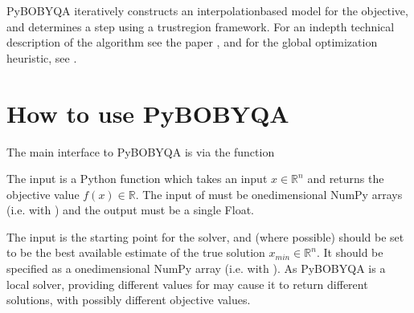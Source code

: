 \documentclass[letterpaper,10pt,english]{sphinxmanual}
\begin{document}
Py\sphinxhyphen{}BOBYQA iteratively constructs an interpolation\sphinxhyphen{}based model for the objective, and determines a step using a trust\sphinxhyphen{}region framework.
For an in\sphinxhyphen{}depth technical description of the algorithm see the paper , and for the global optimization heuristic, see .


\section{How to use Py\sphinxhyphen{}BOBYQA}
\label{\detokenize{userguide:how-to-use-py-bobyqa}}
The main interface to Py\sphinxhyphen{}BOBYQA is via the function 
\begin{quote}

\begin{sphinxVerbatim}[commandchars=\\\{\}]
   
\end{sphinxVerbatim}
\end{quote}

The input  is a Python function which takes an input \(x\in\mathbb{R}^n\) and returns the objective value \(f(x)\in\mathbb{R}\). The input of  must be one\sphinxhyphen{}dimensional NumPy arrays (i.e. with ) and the output must be a single Float.

The input  is the starting point for the solver, and (where possible) should be set to be the best available estimate of the true solution \(x_{min}\in\mathbb{R}^n\). It should be specified as a one\sphinxhyphen{}dimensional NumPy array (i.e. with ).
As Py\sphinxhyphen{}BOBYQA is a local solver, providing different values for  may cause it to return different solutions, with possibly different objective values.
\end{document}
